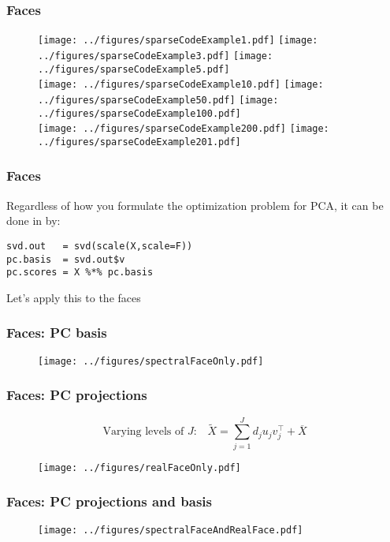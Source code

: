 \documentclass[12pt]{beamer}
\begin{document}
\begin{frame}[fragile]
\frametitle{Faces}
\begin{figure}
\centering
\texttt{[image: ../figures/sparseCodeExample1.pdf]}
\texttt{[image: ../figures/sparseCodeExample3.pdf]}
\texttt{[image: ../figures/sparseCodeExample5.pdf]}\\
\texttt{[image: ../figures/sparseCodeExample10.pdf]}
\texttt{[image: ../figures/sparseCodeExample50.pdf]}
\texttt{[image: ../figures/sparseCodeExample100.pdf]} \\
\texttt{[image: ../figures/sparseCodeExample200.pdf]}
\texttt{[image: ../figures/sparseCodeExample201.pdf]}
\end{figure}
\end{frame}

\begin{frame}[fragile]
\frametitle{Faces}
Regardless of how you formulate the optimization problem for PCA, it can be done in  by:
\begin{verbatim}
svd.out   = svd(scale(X,scale=F))
pc.basis  = svd.out$v
pc.scores = X %*% pc.basis
\end{verbatim}
\vsp

Let's apply this to the faces
\end{frame}

\begin{frame}[fragile]
\frametitle{Faces: PC basis}
\begin{figure}
\centering
\texttt{[image: ../figures/spectralFaceOnly.pdf]}
\end{figure}
\end{frame}

\begin{frame}[fragile]
\frametitle{Faces: PC projections}
\[
\textrm{Varying levels of $J$:} \quad \tilde{X} = \sum_{j=1}^J d_j u_j v_j^{\top} + \overline{X}
\]
\begin{figure}
\centering
\texttt{[image: ../figures/realFaceOnly.pdf]}
\end{figure}
\end{frame}

\begin{frame}[fragile]
\frametitle{Faces: PC projections and basis}
\begin{figure}
\centering
\texttt{[image: ../figures/spectralFaceAndRealFace.pdf]}
\end{figure}
\end{frame}
\end{document}
